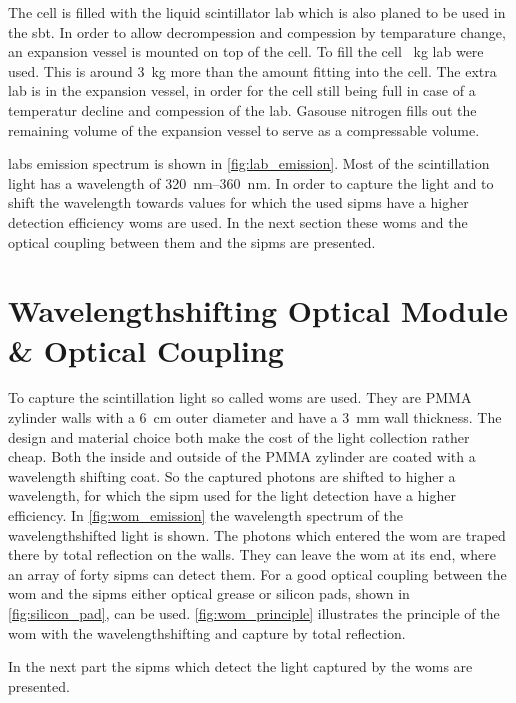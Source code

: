 The cell is filled with the liquid scintillator \ac{lab} which is also planed to be used in the \ac{sbt}.
In order to allow decrompession and compession by temparature change, an expansion vessel is mounted on top of the cell.
To fill the cell \SI{}{\kilo\gram} \ac{lab} were used.
This is around \SI{3}{\kilo\gram} more than the amount fitting into the cell.
The extra \ac{lab} is in the expansion vessel, in order for the cell still being full in case of a temperatur decline and compession of the \ac{lab}.
Gasouse nitrogen fills out the remaining volume of the expansion vessel to serve as a compressable volume. 

\ac{lab}s emission spectrum is shown in \autoref{fig:lab_emission}.
Most of the scintillation light has a wavelength of \SIrange{320}{360}{\nano\meter}.
In order to capture the light and to shift the wavelength towards values for which the used \acp{sipm} have a higher detection efficiency \acp{wom} are used.
In the next section these \acp{wom} and the optical coupling between them and the \acp{sipm} are presented.



\section{Wavelengthshifting Optical Module \& Optical Coupling}

To capture the scintillation light so called \acp{wom} are used.
They are PMMA zylinder walls with a \SI{6}{\centi\meter} outer diameter and have a \SI{3}{\milli\meter} wall thickness.
The design and material choice both make the cost of the light collection rather cheap.
Both the inside and outside of the PMMA zylinder are coated with a wavelength shifting coat.
So the captured photons are shifted to higher a wavelength, for which the \ac{sipm} used for the light detection have a higher efficiency.
In \autoref{fig:wom_emission} the wavelength spectrum of the wavelengthshifted light is shown.
The photons which entered the \ac{wom} are traped there by total reflection on the walls.
They can leave the \ac{wom} at its end, where an array of forty \acp{sipm} can detect them.
For a good optical coupling between the \ac{wom} and the \acp{sipm} either optical grease or silicon pads, shown in \autoref{fig:silicon_pad}, can be used.
\autoref{fig:wom_principle} illustrates the principle of the \ac{wom} with the wavelengthshifting and capture by total reflection.

In the next part the \acp{sipm} which detect the light captured by the \acp{wom} are presented.


